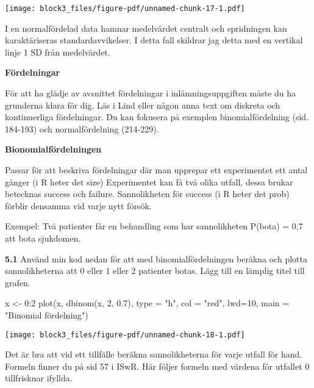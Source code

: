 \documentclass[
  letterpaper,
  DIV=11,
  numbers=noendperiod]{scrartcl}
\newenvironment{Shaded}{\begin{snugshade}}{\end{snugshade}}
\newcommand{\AttributeTok}[1]{\textcolor[rgb]{0.40,0.45,0.13}{#1}}
\newcommand{\DecValTok}[1]{\textcolor[rgb]{0.68,0.00,0.00}{#1}}
\newcommand{\FloatTok}[1]{\textcolor[rgb]{0.68,0.00,0.00}{#1}}
\newcommand{\FunctionTok}[1]{\textcolor[rgb]{0.28,0.35,0.67}{#1}}
\newcommand{\NormalTok}[1]{\textcolor[rgb]{0.00,0.23,0.31}{#1}}
\newcommand{\OtherTok}[1]{\textcolor[rgb]{0.00,0.23,0.31}{#1}}
\newcommand{\SpecialCharTok}[1]{\textcolor[rgb]{0.37,0.37,0.37}{#1}}
\newcommand{\StringTok}[1]{\textcolor[rgb]{0.13,0.47,0.30}{#1}}
\begin{document}
\texttt{[image: block3\_files/figure-pdf/unnamed-chunk-17-1.pdf]}

I en normalfördelad data hamnar medelvärdet centralt och spridningen kan
karaktäriseras standardavvikelser. I detta fall skildrar jag detta med
en vertikal linje 1 SD från medelvärdet.

\textbf{Fördelningar}

För att ha glädje av avsnittet fördelningar i inlämningsuppgiften måste
du ha grunderna klara för dig. Läs i Lind eller någon anna text om
diskreta och kontinuerliga fördelningar. Du kan fokusera på exemplen
binomialfördelning (sid. 184-193) och normalfördelning (214-229).

\textbf{Bionomialfördelningen}

Passar för att beskriva fördelningar där man upprepar ett experimentet
ett antal gånger (i R heter det size) Experimentet kan få två olika
utfall, dessa brukar betecknas success och failure. Sannolikheten för
success (i R heter det prob) förblir densamma vid varje nytt försök.

Exempel: Två patienter får en behandling som har sannolikheten P(bota) =
0,7 att bota sjukdomen.

\textbf{5.1} Använd min kod nedan för att med binomialfördelningen
beräkna och plotta sannolikheterna att 0 eller 1 eller 2 patienter
botas. Lägg till en lämplig titel till grafen.

\begin{Shaded}
\begin{Highlighting}[]
\NormalTok{x }\OtherTok{\textless{}{-}} \DecValTok{0}\SpecialCharTok{:}\DecValTok{2}
\FunctionTok{plot}\NormalTok{(x, }\FunctionTok{dbinom}\NormalTok{(x, }\DecValTok{2}\NormalTok{, }\FloatTok{0.7}\NormalTok{), }\AttributeTok{type =} \StringTok{"h"}\NormalTok{, }\AttributeTok{col =} \StringTok{"red"}\NormalTok{, }\AttributeTok{lwd=}\DecValTok{10}\NormalTok{, }\AttributeTok{main =} \StringTok{"Binomial fördelning"}\NormalTok{)}
\end{Highlighting}
\end{Shaded}

\texttt{[image: block3\_files/figure-pdf/unnamed-chunk-18-1.pdf]}

Det är bra att vid ett tillfälle beräkna sannolikheterna för varje
utfall för hand. Formeln finner du på sid 57 i ISwR. Här följer formeln
med värdena för utfallet 0 tillfrisknar ifyllda.
\end{document}
